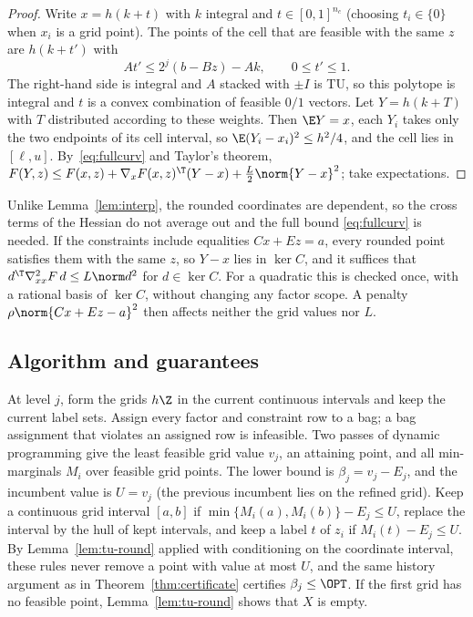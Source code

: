 \begin{proof}
Write $x=h(k+t)$ with $k$ integral and $t\in[0,1]^{n_c}$ (choosing $t_i\in\{0\}$
when $x_i$ is a grid point). The points of the cell that are feasible
with the same $z$ are $h(k+t')$ with
\[
At'\le2^j(b-Bz)-Ak,\qquad0\le t'\le1 .
\]
The right-hand side is integral and $A$ stacked with $\pm I$ is TU, so this
polytope is integral \cite{HoffmanKruskal1956} and $t$ is a convex
combination of feasible $0/1$ vectors. Let $Y=h(k+T)$ with $T$ distributed
according to these weights. Then $\E Y=x$, each $Y_i$ takes only the two
endpoints of its cell interval, so $\E(Y_i-x_i)^2\le h^2/4$, and the cell
lies in $[\ell,u]$. By~\eqref{eq:fullcurv} and Taylor's theorem,
$F(Y,z)\le F(x,z)+\nabla_xF(x,z)^\T(Y-x)+\frac L2\norm{Y-x}^2$; take
expectations.
\end{proof}

Unlike Lemma~\ref{lem:interp}, the rounded coordinates are dependent, so the
cross terms of the Hessian do not average out and the full bound
\eqref{eq:fullcurv} is needed. If the constraints include equalities
$Cx+Ez=a$, every rounded point satisfies them with the same $z$, so $Y-x$
lies in $\ker C$, and it suffices that $d^\T\nabla^2_{xx}F\,d\le L\norm d^2$ for
$d\in\ker C$. For a quadratic this is checked once, with a rational basis of
$\ker C$, without changing any factor scope. A penalty $\rho\norm{Cx+Ez-a}^2$
then affects neither the grid values nor $L$.

\subsection{Algorithm and guarantees}
At level $j$, form the grids $h\Z$ in the current continuous intervals and
keep the current label sets. Assign every factor and constraint row to a bag;
a bag assignment that violates an assigned row is infeasible. Two passes
of dynamic programming give the least feasible grid value $v_j$, an
attaining point, and all min-marginals $M_i$ over feasible grid points.
The lower bound is $\beta_j=v_j-E_j$, and the incumbent value is $U=v_j$ (the
previous incumbent lies on the refined grid). Keep a continuous grid
interval $[a,b]$ if $\min\{M_i(a),M_i(b)\}-E_j\le U$, replace the interval by
the hull of kept intervals, and keep a label $t$ of $z_i$ if
$M_i(t)-E_j\le U$. By Lemma~\ref{lem:tu-round} applied with conditioning on
the coordinate interval, these rules never remove a point with value at
most $U$, and the same history argument as in
Theorem~\ref{thm:certificate} certifies $\beta_j\le\OPT$. If the first grid has
no feasible point, Lemma~\ref{lem:tu-round} shows that $X$ is empty.


